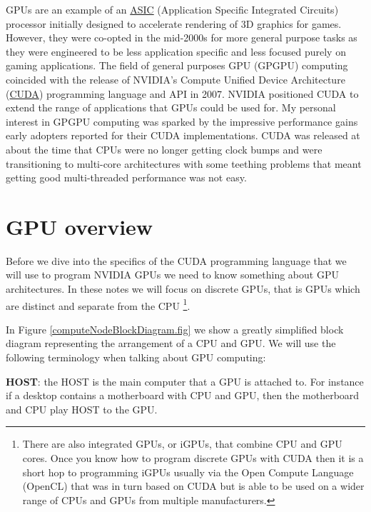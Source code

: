 GPUs are an example of an  \href{https://en.wikipedia.org/wiki/Application-specific_integrated_circuit}{ASIC} (Application Specific Integrated Circuits) processor initially designed to accelerate rendering of 3D graphics for games. However, they were co-opted in the mid-2000s for more general purpose tasks as they were engineered to be less application specific and less focused purely on gaming applications. The field of general purposes GPU (GPGPU) computing coincided with the release of NVIDIA's Compute Unified Device Architecture (\href{https://en.wikipedia.org/wiki/CUDA}{CUDA}) programming language and API in 2007. NVIDIA positioned CUDA to extend the range of applications that GPUs could be used for. My personal interest in GPGPU computing was sparked by the impressive performance gains early adopters reported for their CUDA implementations. CUDA was released at about the time that CPUs were no longer getting clock bumps and were transitioning to multi-core architectures with some teething problems that meant getting good multi-threaded performance was not easy.

\section{GPU overview}

Before we dive into the specifics of the CUDA programming language that we will use to program NVIDIA GPUs we need to know something about GPU architectures. In these notes we will focus on discrete GPUs, that is GPUs which are distinct and separate from the CPU \footnote{There are also integrated GPUs, or iGPUs, that combine CPU and GPU cores. Once you know how to program discrete GPUs with CUDA then it is a short hop to programming iGPUs usually via the Open Compute Language (OpenCL) that was in turn based on CUDA but is able to be used on a wider range of CPUs and GPUs from multiple manufacturers.}.  



In Figure \ref{computeNodeBlockDiagram.fig} we show a greatly simplified block diagram representing the arrangement of a CPU and GPU. We will use the following terminology when talking about GPU computing:

{\bf HOST}: the HOST is the main computer that a GPU is attached to. For instance if a desktop contains a motherboard with CPU and GPU, then the motherboard and CPU play HOST to the GPU.

